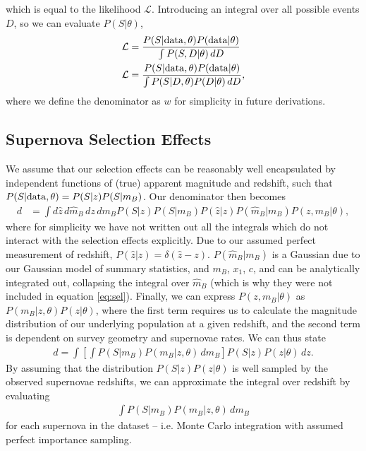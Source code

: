 \documentclass[a4paper,fleqn,usenatbib]{mnras}
\begin{document}
which is equal to the likelihood $\mathcal{L}$. Introducing an integral over all possible events $D$, so we can evaluate $P(S|\theta)$, 
\begin{align}
\mathcal{L}&= \frac{P(S|{\rm data},\theta) P({\rm data}|\theta)}{\int P(S, D|\theta)\, dD} \\
\mathcal{L} &= \frac{P(S|{\rm data},\theta) P({\rm data}|\theta)}{\int P(S | D, \theta) P(D|\theta)\, dD}, \label{eq:app_main}
\end{align}
where we define the denominator as $w$ for simplicity in future derivations.



\subsection{Supernova Selection Effects}

We assume that our selection effects can be reasonably well encapsulated by independent functions of (true) apparent magnitude and redshift, such that $P(S|{\rm data}, \theta) = P(S|z) P(S|m_B)$. Our denominator then becomes
\begin{align}
d &= \int d\hat{z} \, d\hat{m}_B \, dz \, dm_B P(S|z) P(S|m_B) P(\hat{z}|z) P(\hat{m}_B|m_B) P(z, m_B | \theta), \label{eq:sel}
\end{align}
where for simplicity we have not written out all the integrals which do not interact with the selection effects explicitly. Due to our assumed perfect measurement of redshift, $P(\hat{z}|z) = \delta(\hat{z} - z)$. $P(\hat{m}_B | m_B)$ is a Gaussian due to our Gaussian model of summary statistics, and $m_B$, $x_1$, $c$, and can be analytically integrated out, collapsing the integral over $\hat{m}_B$ (which is why they were not included in equation \eqref{eq:sel}). Finally, we can express $P(z, m_B | \theta)$ as  $P(m_B | z, \theta) P(z | \theta)$, where the first term requires us to calculate the magnitude distribution of our underlying population at a given redshift, and the second term is dependent on survey geometry and supernovae rates. We can thus state
\begin{align}
d = \int \left[ \int P(S|m_B) P(m_B | z, \theta)\, dm_B \right] P(S|z)P(z|\theta)\, dz.
\end{align}
By assuming that the distribution $P(S|z)P(z|\theta)$ is well sampled by the observed supernovae redshifts, we can approximate the integral over redshift by evaluating
\begin{align}
\int P(S|m_B) P(m_B | z, \theta)\, dm_B \label{eq:selint}
\end{align}
for each supernova in the dataset -- i.e. Monte Carlo integration with assumed perfect importance sampling.
\end{document}
